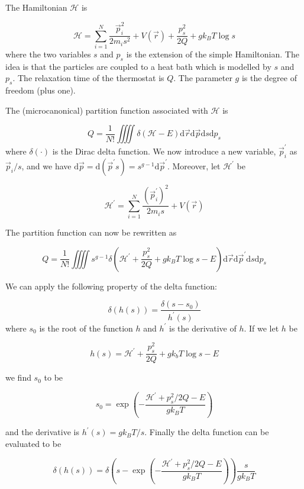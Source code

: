 The Hamiltonian $\mathcal{H}$ is

\begin{equation}
\label{eq:HamilNose}
  \mathcal{H} = \sum_{i=1}^N \frac{\vec{p}_i^2}{2m_i s^2} + V(\vec{r})
     + \frac{p_s^2}{2Q} + gk_B T\log s
\end{equation}
where the two variables $s$ and $p_s$ is the extension of the simple
Hamiltonian. The idea is that the particles are coupled to a heat bath
which is modelled by $s$ and $p_s$. The relaxation time of the
thermostat is $Q$. The parameter $g$ is the degree of freedom (plus
one).

The (microcanonical) partition function associated with $\mathcal{H}$ is

\begin{equation}
  Q = \frac{1}{N!} \iiiint \delta(\mathcal{H}-E) \mathrm{d}\vec{r}
       \mathrm{d}\vec{p} \mathrm{d}s \mathrm{d}p_s
\end{equation}
where $\delta(\cdot)$ is the Dirac delta function. We now introduce a
new variable, $\vec{p}^{\prime}_i$ as $\vec{p}_i/s$, and we have
$\mathrm{d}\vec{p} = \mathrm{d}(\vec{p}^{\prime} s) =
s^{g-1}\mathrm{d}\vec{p}^{\prime}$. Moreover, let
$\mathcal{H}^{\prime}$ be

\[
  \mathcal{H}^{\prime} = \sum_{i=1}^N \frac{(\vec{p}_i^{\prime})^2}{2m_i s} + V(\vec{r})
\]

The partition function can now be rewritten as

\begin{equation}
  Q = \frac{1}{N!} \iiiint s^{g-1} \delta(\mathcal{H}^{\prime} +
      \frac{p_s^2}{2Q} + g k_B T \log s - E)
      \mathrm{d}\vec{r}\mathrm{d}\vec{p}^{\prime}
      \mathrm{d}s\mathrm{d}p_s
\end{equation}

We can apply the following property of the delta function:

\[
  \delta(h(s)) = \frac{\delta(s-s_0)}{h^{\prime}(s)}
\]
where $s_0$ is the root of the function $h$ and $h^{\prime}$ is the
derivative of $h$. If we let $h$ be

\[
  h(s) = \mathcal{H}^{\prime} + \frac{p_s^2}{2Q} + gk_b T \log s - E
\]

we find $s_0$ to be

\[
  s_0 = \exp\left(-\frac{\mathcal{H}^{\prime} + p_s^2/2Q - E}{gk_B T}\right)
\]

and the derivative is $h^{\prime}(s) = gk_B T/s$. Finally the delta
function can be evaluated to be

\begin{equation}
  \delta(h(s)) = \delta\left(s- \exp\left(-\frac{\mathcal{H}^{\prime} + p_s^2/2Q
                 - E}{gk_B T}\right) \right) \frac{s}{gk_B T}
\end{equation}

